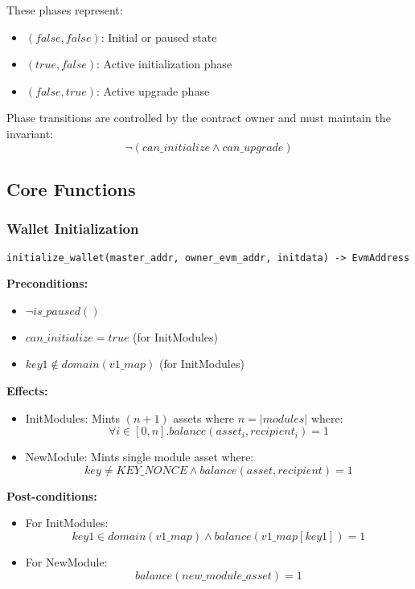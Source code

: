 These phases represent:
\begin{itemize}
    \item $(false,false)$: Initial or paused state
    \item $(true,false)$: Active initialization phase
    \item $(false,true)$: Active upgrade phase
\end{itemize}

Phase transitions are controlled by the contract owner and must maintain the invariant:
\[ \neg(can\_initialize \land can\_upgrade) \]

\subsection{Core Functions}

\subsubsection{Wallet Initialization}
\begin{small}
\begin{verbatim}
initialize_wallet(master_addr, owner_evm_addr, initdata) -> EvmAddress
\end{verbatim}
\end{small}

\textbf{Preconditions:}
\begin{itemize}
    \item $\neg is\_paused()$
    \item $can\_initialize = true$ (for InitModules)
    \item $key1 \notin domain(v1\_map)$ (for InitModules)
\end{itemize}

\textbf{Effects:}
\begin{itemize}
    \item InitModules: Mints $(n+1)$ assets where $n = |modules|$ where:
        \[ \forall i \in [0,n]. balance(asset_i, recipient_i) = 1 \]
    \item NewModule: Mints single module asset where:
        \[ key \neq KEY\_NONCE \land balance(asset, recipient) = 1 \]
\end{itemize}

\textbf{Post-conditions:}
\begin{itemize}
    \item For InitModules:
        \[ key1 \in domain(v1\_map) \land balance(v1\_map[key1]) = 1 \]
    \item For NewModule:
        \[ balance(new\_module\_asset) = 1 \]
\end{itemize}






